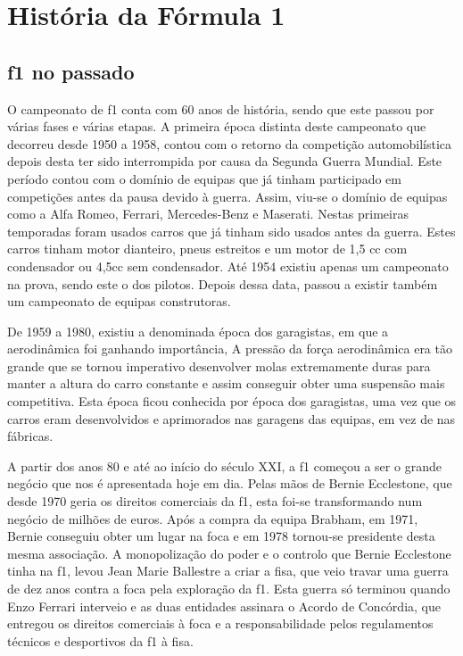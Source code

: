 \documentclass{report}
\begin{document}
\chapter{História da Fórmula 1}
\label{chap.histf1}

\section{\ac{f1} no passado}
\hspace{\parindent}O campeonato de \ac{f1} conta com 60 anos de história, sendo que este passou por várias fases e várias etapas. A primeira época distinta deste campeonato que decorreu desde 1950 a 1958, contou com o retorno da competição automobilística depois desta ter sido interrompida por causa da Segunda Guerra Mundial. Este período contou com o domínio de equipas que já tinham participado em competições antes da pausa devido à guerra. Assim, viu-se o domínio de equipas como a Alfa Romeo, Ferrari, Mercedes-Benz e Maserati. Nestas primeiras temporadas foram usados carros que já tinham sido usados antes da guerra. Estes carros tinham motor dianteiro, pneus estreitos e um motor de 1,5 \ac{cc} com condensador ou 4,5\ac{cc} sem condensador. Até 1954 existiu apenas um campeonato na prova, sendo este o dos pilotos. Depois dessa data, passou a existir também um campeonato de equipas construtoras.\vspace{5mm}

De 1959 a 1980, existiu a denominada época dos garagistas, em que a aerodinâmica foi ganhando importância, A pressão da força aerodinâmica era tão grande que se tornou imperativo desenvolver molas extremamente duras para manter a altura do carro constante e assim conseguir obter uma suspensão mais competitiva. Esta época ficou conhecida por época dos garagistas, uma vez que os carros eram desenvolvidos e aprimorados nas garagens das equipas, em vez de nas fábricas.\vspace{5mm}

A partir dos anos 80 e até ao início do século XXI, a \ac{f1} começou a ser o grande negócio que nos é apresentada hoje em dia. Pelas mãos de Bernie Ecclestone, que desde 1970 geria os direitos comerciais da \ac{f1}, esta foi-se transformando num negócio de milhões de euros. Após a compra da equipa Brabham, em 1971, Bernie conseguiu obter um lugar na \ac{foca} e em 1978 tornou-se presidente desta mesma associação.
A monopolização do poder e o controlo que Bernie Ecclestone tinha na \ac{f1}, levou Jean Marie Ballestre a criar a \ac{fisa}, que veio travar uma guerra de dez anos contra a \ac{foca} pela exploração da \ac{f1}. Esta guerra só terminou quando Enzo Ferrari interveio e as duas entidades assinara o Acordo de Concórdia, que entregou os direitos comerciais à \ac{foca} e a responsabilidade pelos regulamentos técnicos e desportivos da \ac{f1} à \ac{fisa}.\vspace{5mm}
\end{document}
